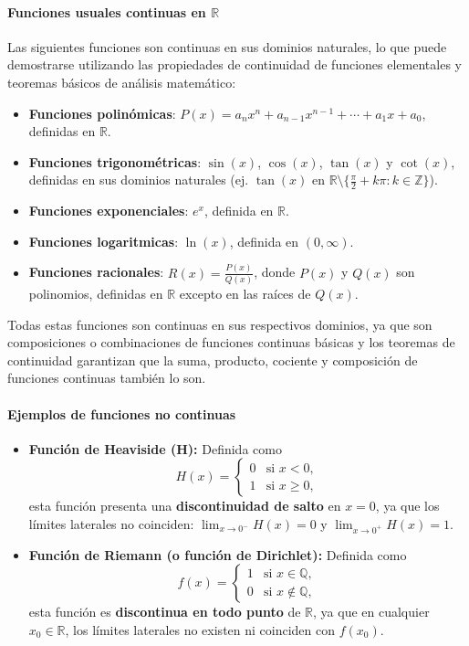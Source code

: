\documentclass[12pt, a4paper]{article}
\theoremstyle{rioplatense}
\begin{document}
\paragraph{Funciones usuales continuas en \(\mathbb{R}\)}
Las siguientes funciones son continuas en sus dominios naturales, lo que puede demostrarse utilizando las propiedades de continuidad de funciones elementales y teoremas básicos de análisis matemático:
\begin{itemize}
    \item \textbf{Funciones polinómicas}: \(P(x) = a_nx^n + a_{n-1}x^{n-1} + \cdots + a_1x + a_0\), definidas en \(\mathbb{R}\).
    \item \textbf{Funciones trigonométricas}: \(\sin(x)\), \(\cos(x)\), \(\tan(x)\) y \(\cot(x)\), definidas en sus dominios naturales (ej. \(\tan(x)\) en \(\mathbb{R} \setminus \{\frac{\pi}{2} + k\pi : k \in \mathbb{Z}\}\)).
    \item \textbf{Funciones exponenciales}: \(e^x\), definida en \(\mathbb{R}\).
    \item \textbf{Funciones logaritmicas}: \(\ln(x)\), definida en \((0, \infty)\).
    \item \textbf{Funciones racionales}: \(R(x) = \frac{P(x)}{Q(x)}\), donde \(P(x)\) y \(Q(x)\) son polinomios, definidas en \(\mathbb{R}\) excepto en las raíces de \(Q(x)\).
\end{itemize}
Todas estas funciones son continuas en sus respectivos dominios, ya que son composiciones o combinaciones de funciones continuas básicas y los teoremas de continuidad garantizan que la suma, producto, cociente y composición de funciones continuas también lo son.

\paragraph{Ejemplos de funciones no continuas}
\begin{itemize}
    \item \textbf{Función de Heaviside (H):}
    Definida como
    \[
    H(x) =
    \begin{cases}
    0 & \text{si } x < 0, \\
    1 & \text{si } x \geq 0,
    \end{cases}
    \]
    esta función presenta una \textbf{discontinuidad de salto} en \(x = 0\), ya que los límites laterales no coinciden: \(\lim_{x \to 0^-} H(x) = 0\) y \(\lim_{x \to 0^+} H(x) = 1\).

    \item \textbf{Función de Riemann (o función de Dirichlet):}
    Definida como
    \[
    f(x) =
    \begin{cases}
    1 & \text{si } x \in \mathbb{Q}, \\
    0 & \text{si } x \notin \mathbb{Q},
    \end{cases}
    \]
    esta función es \textbf{discontinua en todo punto} de \(\mathbb{R}\), ya que en cualquier \(x_0 \in \mathbb{R}\), los límites laterales no existen ni coinciden con \(f(x_0)\).
\end{itemize}
\end{document}
